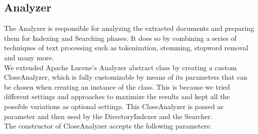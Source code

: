 \subsection{Analyzer}
The Analyzer is responsible for analyzing the extracted documents and preparing them for Indexing and Searching phases. It does so by combining a series of techniques of text processing such as tokenization, stemming, stopword removal and many more.\\
We extended Apache Lucene's Analyzer abstract class by creating a custom CloseAnalyzer, which is fully customizable by means of its parameters that can be chosen when creating an instance of the class. This is because we tried different settings and approaches to maximize the results and kept all the possible variations as optional settings.
This CloseAnalyzer is passed as parameter and then used by the DirectoryIndexer and the Searcher. \\
The constructor of CloseAnalyzer accepts the following parameters:

